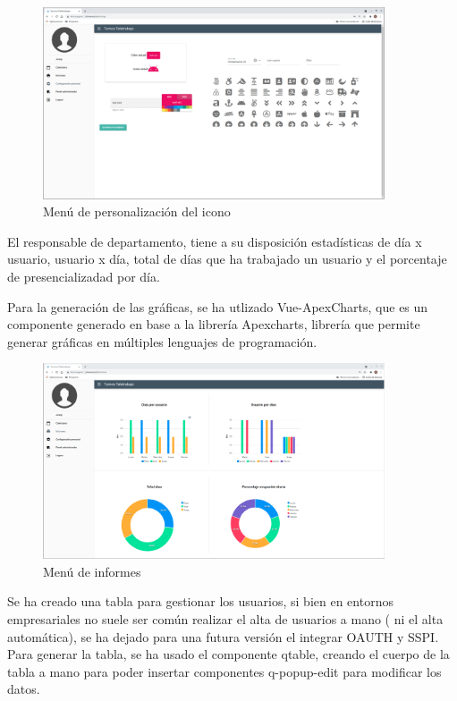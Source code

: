\documentclass[11pt,spanish,listoffigures,listoftables]{tfgetsinf}
\begin{document}
\begin{figure}[ht!] %
  \centering
  \includegraphics[width=0.90\textwidth]{img/opcionesweb.png}
  \caption{Menú de personalización del icono}
  \label{fig:menupersonalizacion}
\end{figure}

El responsable de departamento, tiene a su disposición estadísticas de día x usuario, usuario x día, total de días que ha trabajado un usuario y el porcentaje de presencializadad por día. 

Para la generación de las gráficas, se ha utlizado Vue-ApexCharts, que es un componente generado en base a la librería Apexcharts, librería que permite generar gráficas en múltiples lenguajes de programación.
\newpage

\begin{figure}[ht!] %
  \centering
  \includegraphics[width=0.90\textwidth]{img/informes.png}
  \caption{Menú de informes}
  \label{fig:menuinformes}
\end{figure}

Se ha creado una tabla para gestionar los usuarios, si bien en entornos empresariales no suele ser común realizar el alta de usuarios a mano ( ni el alta automática), se ha dejado para una futura versión el integrar OAUTH  y SSPI.
Para generar la tabla, se ha usado el componente qtable, creando el cuerpo de la tabla a mano para poder insertar componentes q-popup-edit para modificar los datos. 
\end{document}
